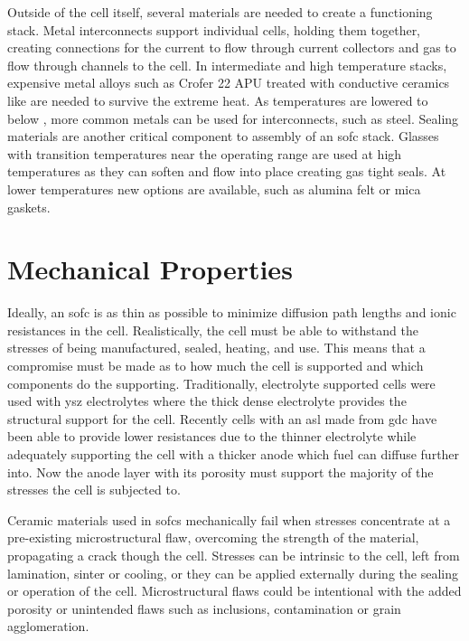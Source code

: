     Outside of the cell itself, several materials are needed to create a functioning stack.
    Metal interconnects support individual cells, holding them together, creating connections for the current to flow through current collectors and gas to flow through channels to the cell.\cite{Ki2010}
    In intermediate and high temperature stacks, expensive metal alloys such as Crofer 22 APU treated with conductive ceramics like  are needed to survive the extreme heat.\cite{Sakai2005,Yang2006}
    As temperatures are lowered to below , more common metals can be used for interconnects, such as steel.
    Sealing materials are another critical component to assembly of an \gls{sofc} stack.
    Glasses with transition temperatures near the operating range are used at high temperatures as they can soften and flow into place creating gas tight seals.
    At lower temperatures new options are available, such as alumina felt or mica gaskets.\cite{Taniguchi2000,Simner2001}

\section{Mechanical Properties}
    Ideally, an \gls{sofc} is as thin as possible to minimize diffusion path lengths and ionic resistances in the cell.\cite{Chan2001}
    Realistically, the cell must be able to withstand the stresses of being manufactured, sealed, heating, and use.
    This means that a compromise must be made as to how much the cell is supported and which components do the supporting.
    Traditionally, electrolyte supported cells were used with \gls{ysz} electrolytes where the thick dense electrolyte provides the structural support for the cell.
    Recently cells with an \gls{asl} made from \gls{gdc} have been able to provide lower resistances due to the thinner electrolyte while adequately supporting the cell with a thicker anode which fuel can diffuse further into.\cite{Fleischhauer2014a,Laurencin2008}
    Now the anode layer with its porosity must support the majority of the stresses the cell is subjected to.

    Ceramic materials used in \glspl{sofc} mechanically fail when stresses concentrate at a pre-existing microstructural flaw, overcoming the strength of the material, propagating a crack though the cell.
    Stresses can be intrinsic to the cell, left from lamination, sinter or cooling, or they can be applied externally during the sealing or operation of the cell.
    Microstructural flaws could be intentional with the added porosity or unintended flaws such as inclusions, contamination or grain agglomeration.


